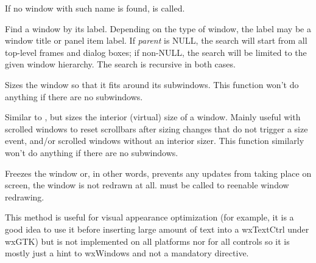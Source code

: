 If no window with such name is found, 
 is called.



\label{wxwindowfindwindowbylabel}


Find a window by its label. Depending on the type of window, the label may be a window title
or panel item label. If {\it parent} is NULL, the search will start from all top-level
frames and dialog boxes; if non-NULL, the search will be limited to the given window hierarchy.
The search is recursive in both cases.



\label{wxwindowfit}


Sizes the window so that it fits around its subwindows. This function won't do
anything if there are no subwindows.

\label{wxwindowfitinside}


Similar to , but sizes the interior (virtual) size
of a window.  Mainly useful with scrolled windows to reset scrollbars after
sizing changes that do not trigger a size event, and/or scrolled windows without
an interior sizer.  This function similarly won't do anything if there are no
subwindows.

\label{wxwindowfreeze}


Freezes the window or, in other words, prevents any updates from taking place
on screen, the window is not redrawn at all.  must
be called to reenable window redrawing.

This method is useful for visual appearance optimization (for example, it
is a good idea to use it before inserting large amount of text into a
wxTextCtrl under wxGTK) but is not implemented on all platforms nor for all
controls so it is mostly just a hint to wxWindows and not a mandatory
directive.

